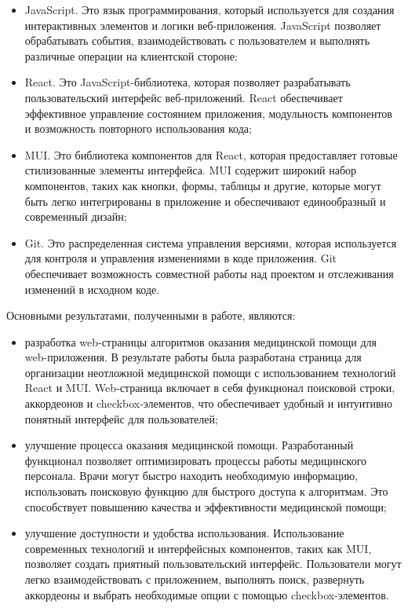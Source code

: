 \begin{itemize}
    \item JavaScript. Это язык программирования, который используется для создания интерактивных элементов и логики веб-приложения. JavaScript позволяет обрабатывать события, взаимодействовать с пользователем и выполнять различные операции на клиентской стороне;
    \item React. Это JavaScript-библиотека, которая позволяет разрабатывать пользовательский интерфейс веб-приложений. React обеспечивает эффективное управление состоянием приложения, модульность компонентов и возможность повторного использования кода;
    \item MUI. Это библиотека компонентов для React, которая предоставляет готовые стилизованные элементы интерфейса. MUI содержит широкий набор компонентов, таких как кнопки, формы, таблицы и другие, которые могут быть легко интегрированы в приложение и обеспечивают единообразный и современный дизайн;
    \item Git. Это распределенная система управления версиями, которая используется для контроля и управления изменениями в коде приложения. Git обеспечивает возможность совместной работы над проектом и отслеживания изменений в исходном коде.
\end{itemize}

Основными результатами, полученными в работе, являются:

\begin{itemize}
    \item разработка web-страницы алгоритмов оказания медицинской помощи для web-приложения. В результате работы была разработана страница для организации неотложной медицинской помощи с использованием технологий React и MUI. Web-страница включает в себя функционал поисковой строки, аккордеонов и checkbox-элементов, что обеспечивает удобный и интуитивно понятный интерфейс для пользователей;
    \item улучшение процесса оказания медицинской помощи. Разработанный функционал позволяет оптимизировать процессы работы медицинского персонала. Врачи могут быстро находить необходимую информацию, использовать поисковую функцию для быстрого доступа к алгоритмам. Это способствует повышению качества и эффективности медицинской помощи;
    \item улучшение доступности и удобства использования. Использование современных технологий и интерфейсных компонентов, таких как MUI, позволяет создать приятный пользовательский интерфейс. Пользователи могут легко взаимодействовать с приложением, выполнять поиск, развернуть аккордеоны и выбрать необходимые опции с помощью checkbox-элементов.
\end{itemize}


